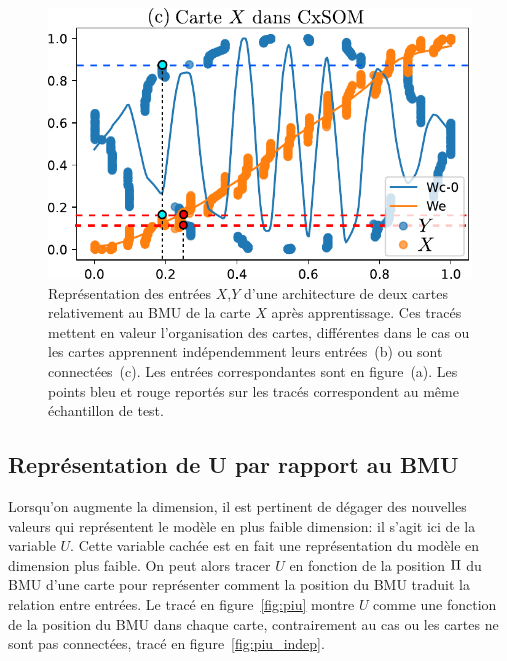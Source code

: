 \begin{figure}
\begin{minipage}{0.38\textwidth}
\includegraphics[width=\textwidth]{weights_2som.pdf}
\end{minipage}
\label{fig:inputs}
\caption{Représentation des entrées $X$,$Y$ d'une architecture de deux cartes relativement au BMU de la carte $X$ après apprentissage. Ces tracés mettent en valeur l'organisation des cartes, différentes dans le cas ou les cartes apprennent indépendemment leurs entrées~(b) ou sont connectées~(c). Les entrées correspondantes sont en figure~(a). Les points bleu et rouge reportés sur les tracés correspondent au même échantillon de test.}
\end{figure}

\subsection{Représentation de U par rapport au BMU}

Lorsqu'on augmente la dimension, il est pertinent de dégager des nouvelles valeurs qui représentent le modèle en plus faible dimension: il s'agit ici de la variable $U$. Cette variable cachée est en fait une représentation du modèle en dimension plus faible. On peut alors tracer $U$ en fonction de la position $\Pi$ du BMU d'une carte pour représenter comment la position du BMU traduit la relation entre entrées. Le tracé en figure~\ref{fig:piu} montre $U$ comme une fonction de la position du BMU dans chaque carte, contrairement au cas ou les cartes ne sont pas connectées, tracé en figure~\ref{fig:piu_indep}. 

